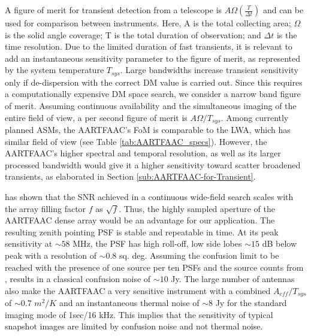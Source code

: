 \documentclass[referee]{aa}
\begin{document}
A  figure of  merit  for transient  detection  \citep{cordes2004dynamic} from  a
telescope  is  $A\Omega\left(\frac{T}{\Delta  t}\right)$  and can  be  used  for
comparison between instruments.  Here, A  is the total collecting area; $\Omega$
is the solid angle coverage; T is the total duration of observation; and $\Delta
t$ is the time resolution. Due to the limited duration of fast transients, it is
relevant to add  an instantaneous sensitivity parameter to  the figure of merit,
as represented  by the system temperature $T_{sys}$.   Large bandwidths increase
transient sensitivity only if de-dispersion with the correct DM value is carried
out.   Since this  requires  a  computationally expensive  DM  space search,  we
consider a narrow band figure of merit. Assuming continuous availability and the
simultaneous imaging of  the entire field of view, a per  second figure of merit
is  $A\Omega/T_{sys}$.  Among  currently  planned ASMs,  the  AARTFAAC's FoM  is
comparable  to   the  LWA,   which  has  similar   field  of  view   (see  Table
\ref{tab:AARTFAAC_specs}). However, the  AARTFAAC's higher spectral and temporal
resolution, as  well as its  larger processed bandwidth  would give it  a higher
sensitivity  toward  scatter broadened  transients,  as  elaborated in  Section
\ref{sub:AARTFAAC-for-Transient}.

\citet{backer1999pers}  has  shown  that   the  SNR  achieved  in  a  continuous
wide-field search scales with the  array filling factor $f$ as $\sqrt{f}$. Thus,
the highly  sampled aperture of the  AARTFAAC dense array would  be an advantage
for our application. The resulting  zenith pointing PSF is stable and repeatable
in time. At  its peak sensitivity at $\sim$$58$ MHz, the  PSF has high roll-off,
low side  lobes $\sim$$15$ dB  below peak with  a resolution of  $\sim$$0.8$ sq.
deg.  Assuming the confusion limit to be reached with the presence of one source
per ten PSFs and the  source counts from \citet{bregman2012system}, results in a
classical confusion noise  of $\sim$$10$ Jy.  The large  number of antennas also
make the AARTFAAC a very  sensitive instrument with a combined $A_{eff}/T_{sys}$
of  $\sim$$0.7$ $m^{2}/K$ \citep{wijnholds2011situ}  and an  instantaneous thermal
noise of $\sim$$8$ Jy for the  standard imaging mode of 1sec/16 kHz.  This implies
that the sensitivity  of typical snapshot images are  limited by confusion noise
and not thermal noise.
\end{document}
